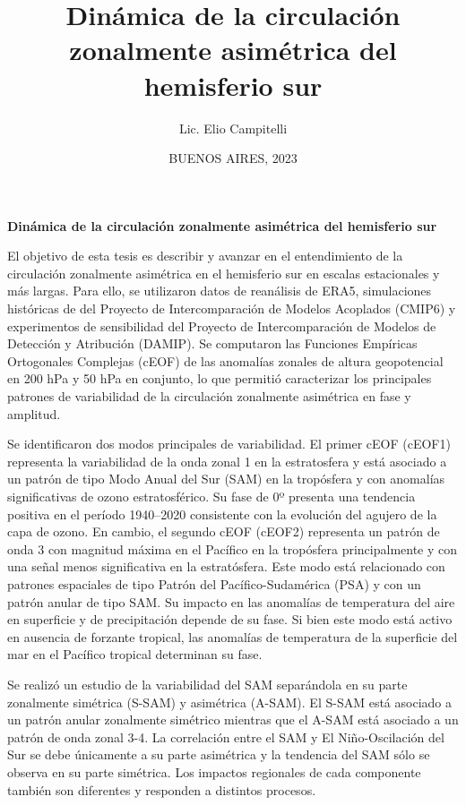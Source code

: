 \documentclass[12pt,oneside,a4paper]{reedthesis}
\title{Dinámica de la circulación zonalmente asimétrica del hemisferio sur}
\author{Lic. Elio Campitelli}
\date{BUENOS AIRES, 2023}
\begin{document}
  \maketitle

\frontmatter %
\pagestyle{empty} %


  \begin{resumen}
    \textbf{Dinámica de la circulación zonalmente asimétrica del hemisferio sur}

    El objetivo de esta tesis es describir y avanzar en el entendimiento de la circulación zonalmente asimétrica en el hemisferio sur en escalas estacionales y más largas.
    Para ello, se utilizaron datos de reanálisis de ERA5, simulaciones históricas de del Proyecto de Intercomparación de Modelos Acoplados (CMIP6) y experimentos de sensibilidad del Proyecto de Intercomparación de Modelos de Detección y Atribución (DAMIP).
    Se computaron las Funciones Empíricas Ortogonales Complejas (cEOF) de las anomalías zonales de altura geopotencial en 200 hPa y 50 hPa en conjunto, lo que permitió caracterizar los principales patrones de variabilidad de la circulación zonalmente asimétrica en fase y amplitud.

    Se identificaron dos modos principales de variabilidad.
    El primer cEOF (cEOF1) representa la variabilidad de la onda zonal 1 en la estratosfera y está asociado a un patrón de tipo Modo Anual del Sur (SAM) en la tropósfera y con anomalías significativas de ozono estratosférico.
    Su fase de 0º presenta una tendencia positiva en el período 1940--2020 consistente con la evolución del agujero de la capa de ozono.
    En cambio, el segundo cEOF (cEOF2) representa un patrón de onda 3 con magnitud máxima en el Pacífico en la tropósfera principalmente y con una señal menos significativa en la estratósfera.
    Este modo está relacionado con patrones espaciales de tipo Patrón del Pacífico-Sudamérica (PSA) y con un patrón anular de tipo SAM.
    Su impacto en las anomalías de temperatura del aire en superficie y de precipitación depende de su fase.
    Si bien este modo está activo en ausencia de forzante tropical, las anomalías de temperatura de la superficie del mar en el Pacífico tropical determinan su fase.

    Se realizó un estudio de la variabilidad del SAM separándola en su parte zonalmente simétrica (S-SAM) y asimétrica (A-SAM).
    El S-SAM está asociado a un patrón anular zonalmente simétrico mientras que el A-SAM está asociado a un patrón de onda zonal 3-4.
    La correlación entre el SAM y El Niño-Oscilación del Sur se debe únicamente a su parte asimétrica y la tendencia del SAM sólo se observa en su parte simétrica.
    Los impactos regionales de cada componente también son diferentes y responden a distintos procesos.


\end{resumen}
\end{document}
